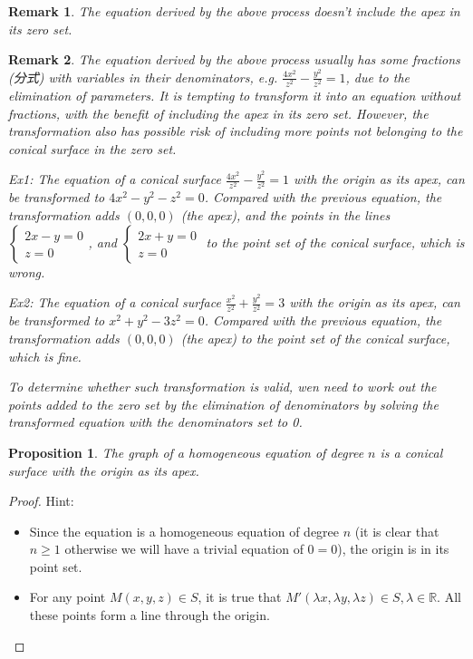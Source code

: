 \documentclass[onecolumn]{ctexart}
\newtheorem{proposition}{Proposition}
\newtheorem{remark}{Remark}
\begin{document}
\begin{remark}
  The equation derived by the above process doesn't include the apex in its zero 
  set.
\end{remark}
\begin{remark}
  The equation derived by the above process usually has some fractions (分式) with 
  variables in their denominators, e.g. $\frac{4x^2}{z^2} - \frac{y^2}{z^2} = 1$, 
  due to the elimination of parameters. It is tempting to transform it into an 
  equation without fractions, with the benefit of including the apex in its zero 
  set. However, the transformation also has possible risk of including more 
  points not belonging to the conical surface in the zero set.

  Ex1: The equation of a conical surface $\frac{4x^2}{z^2} - \frac{y^2}{z^2} = 1$ 
  with the origin as its apex, can be transformed to $4x^2 - y^2 - z^2 = 0$. 
  Compared with the previous equation, the transformation adds $(0, 0, 0)$ (the 
  apex), and the points in the lines
  $\begin{cases}
    2x - y = 0 \\
    z = 0
  \end{cases}$, and
  $\begin{cases}
    2x + y = 0 \\
    z = 0
  \end{cases}$ to the point set of the conical surface, which is wrong.

  Ex2: The equation of a conical surface $\frac{x^2}{z^2} + \frac{y^2}{z^2} = 3$ 
  with the origin as its apex, can be transformed to $x^2 + y^2 - 3z^2 = 0$. 
  Compared with the previous equation, the transformation adds $(0, 0, 0)$ (the 
  apex) to the point set of the conical surface, which is fine.

  To determine whether such transformation is valid, wen need to work out the 
  points added to the zero set by the elimination of denominators by solving the 
  transformed equation with the denominators set to 0.
\end{remark}

\begin{proposition}
  The graph of a homogeneous equation of degree $n$ is a conical surface with 
  the origin as its apex.
\end{proposition}
\begin{proof}
  Hint:
  \begin{itemize}
    \item Since the equation is a homogeneous equation of degree $n$ (it is 
    clear that $n \geq 1$ otherwise we will have a trivial equation of $0 = 0$), 
    the origin is in its point set.
    \item For any point $M(x, y, z) \in S$, it is true that $M'(\lambda x, 
    \lambda y, \lambda z) \in S, \lambda \in \mathbb{R}$. All these points form 
    a line through the origin.
  \end{itemize}
\end{proof}
\end{document}
